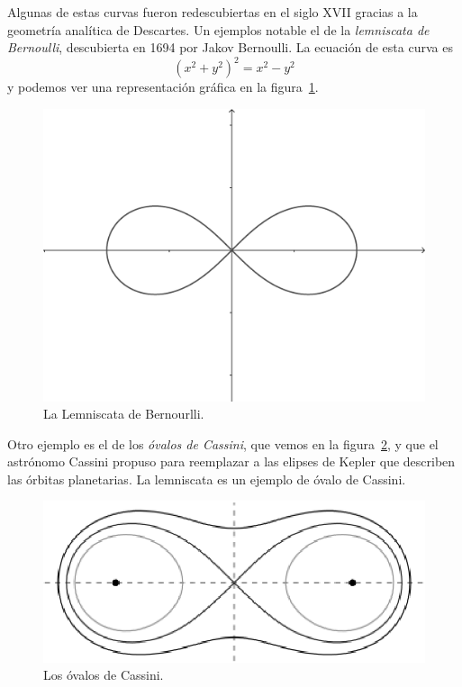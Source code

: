Algunas de estas curvas fueron redescubiertas en el
siglo XVII gracias a la geometría analítica de Descartes. Un ejemplos notable 
el de la \emph{lemniscata de Bernoulli}, descubierta en 1694 por Jakov Bernoulli. La ecuación 
de esta curva es 
\[
	(x^2+y^2)^2=x^2-y^2
\]
y podemos ver una representación gráfica en la figura~\ref{fig:lemniscata}.

\begin{figure}
   \centering
   \includegraphics[scale=0.2]{images/lemniscata}
   \caption{La Lemniscata de Bernourlli.}
   \label{fig:lemniscata}
\end{figure}
 
Otro ejemplo es el de los \emph{óvalos de Cassini}, que vemos en la
figura~\ref{fig:Cassini}, y que el astrónomo Cassini propuso para reemplazar a las
elipses de Kepler que describen las órbitas planetarias. La lemniscata
es un ejemplo de óvalo de Cassini.

\begin{figure}
   \centering
   \includegraphics[scale=0.5]{images/cassini}
   \caption{Los óvalos de Cassini.}
   \label{fig:Cassini}
\end{figure}

